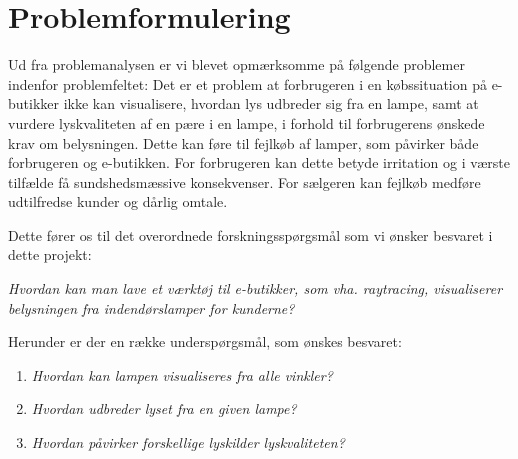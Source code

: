 \section{Problemformulering}

Ud fra problemanalysen er vi blevet opmærksomme på følgende problemer indenfor problemfeltet:
Det er et problem at forbrugeren i en købssituation på e-butikker ikke kan visualisere, hvordan lys udbreder sig fra en lampe, samt at vurdere lyskvaliteten af en pære i en lampe, i forhold til forbrugerens ønskede krav om belysningen. Dette kan føre til fejlkøb af lamper, som påvirker både forbrugeren og e-butikken. For forbrugeren kan dette betyde irritation og i værste tilfælde få sundshedsmæssive konsekvenser. For sælgeren kan fejlkøb medføre udtilfredse kunder og dårlig omtale. 

Dette fører os til det overordnede forskningsspørgsmål som vi ønsker besvaret i dette projekt:

\textit{Hvordan kan man lave et værktøj til e-butikker, som vha. raytracing, visualiserer belysningen fra indendørslamper for kunderne?}

Herunder er der en række underspørgsmål, som ønskes besvaret:

\begin{enumerate}

\item \textit{Hvordan kan lampen visualiseres fra alle vinkler?}
\item \textit{Hvordan udbreder lyset fra en given lampe?}
\item \textit{Hvordan påvirker forskellige lyskilder lyskvaliteten?}

\end{enumerate}